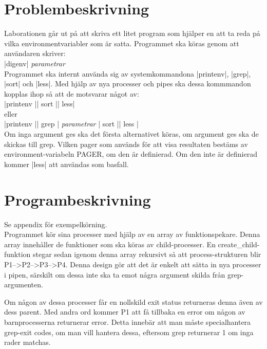 \documentclass[paper=a4, fontsize=11pt]{scrartcl} %
\numberwithin{equation}{section} %
\numberwithin{figure}{section} %
\numberwithin{table}{section} %
\begin{document}
\section{Problembeskrivning}
Laborationen går ut på att skriva ett litet program som hjälper en att ta reda
på vilka environmentvariabler som är satta.
Programmet ska köras genom att användaren skriver:
\\
|digenv| \emph{parametrar}
\\
Programmet ska internt använda sig av systemkommandona |printenv|, |grep|,
|sort| och |less|.
Med hjälp av nya processer och pipes ska dessa kommmandon kopplas ihop
så att de motsvarar något av:
\\
|printenv |\textbar| sort |\textbar| less| \\ eller \\
|printenv |\textbar| grep | \emph{parametrar} \textbar | sort |\textbar| less |
\\
Om inga argument ges ska det första alternativet köras, om argument ges ska
de skickas till grep.
Vilken pager som används för att visa resultaten bestäms av
environment-variabeln PAGER, om den är definierad.
Om den inte är definierad kommer |less| att användas som basfall.


\section{Programbeskrivning}

Se appendix för exempelkörning.\\


Programmet kör sina processer med hjälp av en array av funktionspekare. Denna
array innehåller de funktioner som ska köras av child-processer.
En create\_child-funktion stegar sedan igenom denna array rekursivt så att
process-strukturen blir P1-->P2-->P3-->P4. Denna design gör att det är enkelt
att sätta in nya processer i pipen, särskilt om dessa inte ska ta emot några
argument skilda från grep-argumenten. %

Om någon av dessa processer får en nollskild exit status returneras denna även
av dess parent. Med andra ord kommer P1 att få tillbaka en error om någon av
barnprocesserna returnerar error. Detta innebär att man måste specialhantera
grep-exit codes, om man vill hantera dessa, eftersom grep returnerar 1 om inga
rader matchas. %
\end{document}
